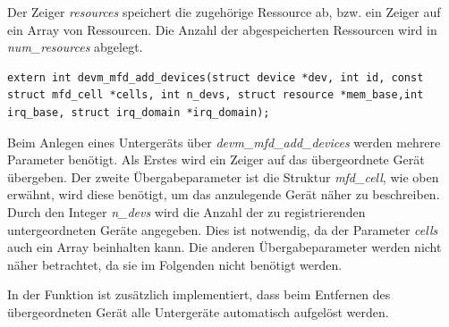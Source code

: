 Der Zeiger \textit{resources} speichert die zugehörige Ressource ab, bzw. ein Zeiger auf ein Array von Ressourcen. Die Anzahl der abgespeicherten Ressourcen wird in \textit{num\_resources} abgelegt.\\

\begin{lstfloat}
\begin{lstlisting}
extern int devm_mfd_add_devices(struct device *dev, int id, const struct mfd_cell *cells, int n_devs, struct resource *mem_base,int irq_base, struct irq_domain *irq_domain);
\end{lstlisting}
\end{lstfloat}

Beim Anlegen eines Untergeräts über \textit{devm\_mfd\_add\_devices} werden mehrere Parameter benötigt. 
Als Erstes wird ein Zeiger auf das übergeordnete Gerät übergeben. Der zweite Übergabeparameter ist die Struktur \textit{mfd\_cell}, wie oben erwähnt, wird diese benötigt, um das anzulegende Gerät näher zu beschreiben.
Durch den Integer \textit{n\_devs} wird die Anzahl der zu registrierenden untergeordneten Geräte angegeben. Dies ist notwendig, da der Parameter \textit{cells} auch ein Array beinhalten kann. 
Die anderen Übergabeparameter werden nicht näher betrachtet, da sie im Folgenden nicht benötigt werden. \cite[Zeile 359ff.]{linuxsourcedriver} %


In der Funktion ist zusätzlich implementiert, dass beim Entfernen des übergeordneten Gerät alle Untergeräte automatisch aufgelöst werden. \cite[Zeile 356f.]{linuxsourcedriver}%



